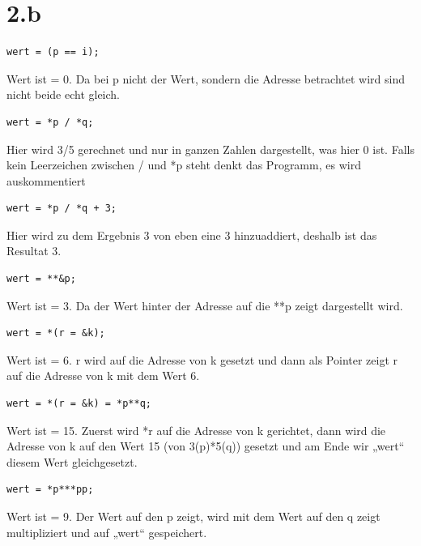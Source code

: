 \section*{2.b}
\begin{lstlisting}
wert = (p == i);
\end{lstlisting}
Wert ist = 0. Da bei p nicht der Wert, sondern die Adresse betrachtet wird sind nicht beide echt gleich.
\begin{lstlisting}
wert = *p / *q;
\end{lstlisting}
Hier wird 3/5 gerechnet und nur in ganzen Zahlen dargestellt, was hier 0 ist. Falls kein Leerzeichen zwischen / und *p steht denkt das Programm, es wird auskommentiert
\begin{lstlisting}
wert = *p / *q + 3;
\end{lstlisting}
Hier wird zu dem Ergebnis 3 von eben eine 3 hinzuaddiert, deshalb ist das Resultat 3.
\begin{lstlisting}
wert = **&p;
\end{lstlisting}
Wert ist = 3. Da der Wert hinter der Adresse auf die **p zeigt dargestellt wird.
\begin{lstlisting}
wert = *(r = &k);
\end{lstlisting}
Wert ist = 6. r wird auf die Adresse von k gesetzt und dann als Pointer zeigt r auf die Adresse von k mit dem Wert 6.
\begin{lstlisting}
wert = *(r = &k) = *p**q;
\end{lstlisting}
Wert ist = 15. Zuerst wird *r auf die Adresse von k gerichtet, dann wird die Adresse von k auf den Wert 15 (von 3(p)*5(q)) gesetzt und am Ende wir „wert“ diesem Wert gleichgesetzt.
\begin{lstlisting}
wert = *p***pp;
\end{lstlisting}
Wert ist = 9. Der Wert auf den p zeigt, wird mit dem Wert auf den q zeigt multipliziert und auf „wert“ gespeichert.


